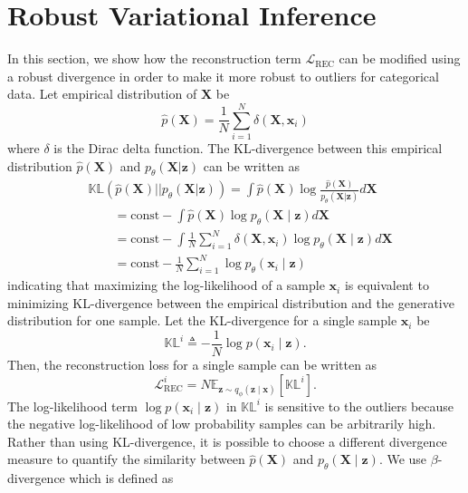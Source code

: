 \documentclass{article}
\def\bx{\mathbf{x}}
\def\bX{\mathbf{X}}
\def\bz{\mathbf{z}}
\theoremstyle{plain}
\theoremstyle{definition}
\begin{document}
\section{Robust Variational Inference}
In this section, we show how the reconstruction term $\mathcal{L}_{\textrm{REC}}$ can be modified using a robust divergence in order to make it more robust to outliers for categorical data. Let empirical distribution of $\bX$ be
\begin{equation}
\hat{p}(\bX) = \frac{1}{N} \sum_{i=1}^N \delta(\bX, \bx_i)
\end{equation}
where $\delta$ is the Dirac delta function. The KL-divergence between this empirical distribution $\hat{p}(\bX)$ and $p_{\theta}(\bX | \bz)$ can be written as
\begin{equation}
\begin{split}
 & \mathbb{KL}\left(\hat{p}(\bX) || p_{\theta}(\bX | \bz)  \right) = \int \hat{p}(\bX) \log \frac{\hat{p}(\bX)}{p_{\theta}(\bX | \bz)} d \bX  \\
& \quad \quad = \textrm{const} - \int \hat{p}(\bX) \log p_{\theta} (\bX \mid \bz) d \bX  \\
& \quad \quad = \textrm{const} - \int \frac{1}{N} \sum_{i=1}^N \delta(\bX, \bx_i) \log p_{\theta}(\bX \mid \bz) d \bX \\
& \quad \quad = \textrm{const} - \frac{1}{N} \sum_{i=1}^N \log p_{\theta}(\bx_i \mid \bz)
\end{split}
\end{equation}
indicating that maximizing the log-likelihood of a sample $\bx_i$ is equivalent to minimizing KL-divergence between the empirical distribution and the generative distribution for one sample. Let the KL-divergence for a single sample $\bx_i$ be
\begin{equation}
\mathbb{KL}^i \triangleq -\frac{1}{N} \log p(\bx_i \mid \bz).
\end{equation}
Then, the reconstruction loss for a single sample can be written as
\begin{equation}
\mathcal{L}_{\textrm{REC}}^i = N \mathbb{E}_{\bz \sim q_{\phi}(\bz \mid \bx)} \left [ \mathbb{KL}^i \right ].
\end{equation}
The log-likelihood term $ \log p(\bx_i \mid \bz)$ in $\mathbb{KL}^i$ is sensitive to the outliers because the negative log-likelihood of low probability samples can be arbitrarily high. Rather than using KL-divergence, it is possible to choose a different divergence measure to quantify the similarity between $\hat{p}(\bX)$ and $p_{\theta} (\bX \mid \bz)$. We use $\beta$-divergence which is defined as
\end{document}
